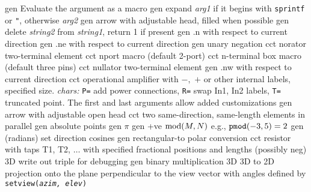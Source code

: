   {gen}
  {Evaluate the argument as a macro}
  {gen}
  {expand {\sl arg1} if it begins
    with {\tt sprintf} or {\tt "}, otherwise {\sl arg2}}
  {gen}
  {arrow with adjustable head, filled when possible}
  {gen}
  {delete {\sl string2} from {\sl string1}, return 1 if present}
  {gen}
  {.n with respect to current direction}
  {gen}
  {.ne with respect to current direction}
  {gen}
  {unary negation}
  {cct}
  { norator two-terminal element }
  {cct}
  {nport macro (default 2-port)}
  {cct}
  {n-terminal box macro (default three pins)}
  {cct}
  { nullator two-terminal element }
  {gen}
  {.nw with respect to current direction}
  {cct}
  {operational amplifier with $-,$ $+$ or other internal labels,
    specified size. {\sl chars:} {\tt P=} add power connections,
    {\tt R=} swap In1, In2 labels,
    {\tt T=} truncated point.
    The first and last arguments allow added customizations }
  {gen}
  {arrow with adjustable open head}
  {cct}
  {two same-direction, same-length elements in parallel}
  {gen}
  {absolute points}
  {gen}
  {$\pi$}
  {gen}
  {+ve $\hbox{mod}(M,N)$ e.g., $\hbox{\tt pmod}(-3,5)=2$}
  {gen}
  {(radians) set direction cosines}
  {gen}
  {rectangular-to polar conversion}
  {cct}
  {resistor with taps T1, T2, $\ldots$
    with specified fractional positions and lengths (possibly neg) }
  {3D}
  {write out triple for debugging}
  {gen}
  {binary multiplication}
  {3D}
  {3D to 2D projection onto the plane perpendicular to the view vector with
   angles defined by {\tt setview({\sl azim, elev})}}
